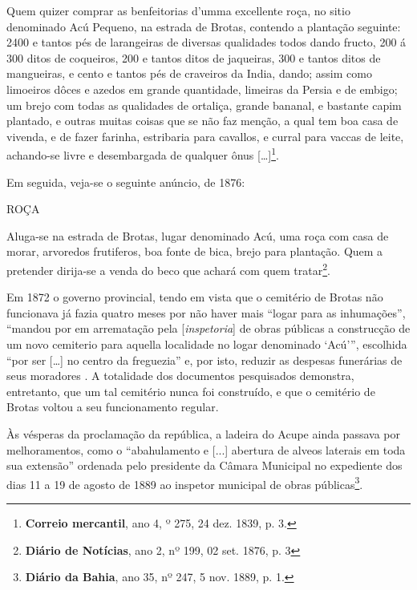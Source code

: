 \begin{citacao}
Quem quizer comprar as benfeitorias d'umma excellente roça, no sitio denominado Acú Pequeno, na estrada de Brotas, contendo a plantação seguinte: 2400 e tantos pés de larangeiras de diversas qualidades todos dando fructo, 200 á 300 ditos de coqueiros, 200 e tantos ditos de jaqueiras, 300 e tantos ditos de mangueiras, e cento e tantos pés de craveiros da India, dando; assim como limoeiros dôces e azedos em grande quantidade, limeiras da Persia e de embigo; um brejo com todas as qualidades de ortaliça, grande bananal, e bastante capim plantado, e outras muitas coisas que se não faz menção, a qual tem boa casa de vivenda, e de fazer farinha, estribaria para cavallos, e curral para vaccas de leite, achando-se livre e desembargada de qualquer ônus [\dots]\footnote{\textbf{Correio mercantil}, ano 4, º 275, 24 dez. 1839, p. 3.}.
\end{citacao}

Em seguida, veja-se o seguinte anúncio, de 1876:

\begin{citacao}
ROÇA

Aluga-se na estrada de Brotas, lugar denominado Acú, uma roça com casa de morar, arvoredos frutiferos, boa fonte de bica, brejo para plantação. Quem a pretender dirija-se a venda do beco que achará com quem tratar\footnote{\textbf{Diário de Notícias}, ano 2, nº 199, 02 set. 1876, p. 3}.
\end{citacao}

Em 1872 o governo provincial, tendo em vista que o cemitério de Brotas não funcionava já fazia quatro meses por não haver mais ``logar para as inhumações'', ``mandou por em arrematação pela [\textit{inspetoria}] de obras públicas a construcção de um novo cemiterio para aquella localidade no logar denominado `Acú''', escolhida ``por ser [\dots] no centro da freguezia'' e, por isto, reduzir as despesas funerárias de seus moradores \cite[p.~12]{bahia_1872}. A totalidade dos documentos pesquisados demonstra, entretanto, que um tal cemitério nunca foi construído, e que o cemitério de Brotas voltou a seu funcionamento regular.

Às vésperas da proclamação da república, a ladeira do Acupe ainda passava por melhoramentos, como o ``abahulamento e [...] abertura de alveos laterais em toda sua extensão'' ordenada pelo presidente da Câmara Municipal no expediente dos dias 11 a 19 de agosto de 1889 ao inspetor municipal de obras públicas\footnote{\textbf{Diário da Bahia}, ano 35, nº 247, 5 nov. 1889, p. 1.}.

